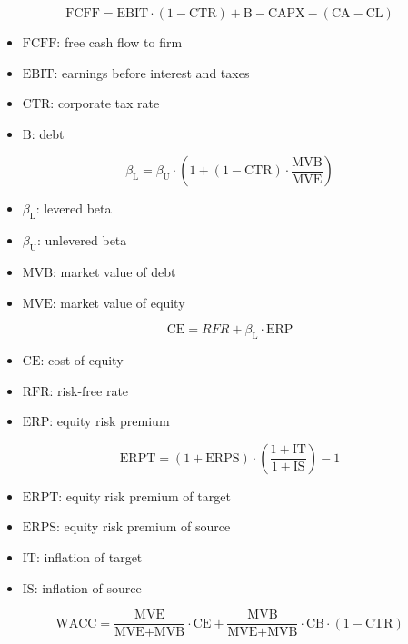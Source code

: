 $$
\text{FCFF} = \text{EBIT} \cdot (1 - \text{CTR}) + \text{B} - \text{CAPX} - (\text{CA} - \text{CL}) 
$$

\begin{itemize}
  \item[] $\text{FCFF}$: free cash flow to firm
  \item[] $\text{EBIT}$: earnings before interest and taxes
  \item[] $\text{CTR}$: corporate tax rate
  \item[] $\text{B}$: debt
\end{itemize}

$$
\beta_{\text{L}} = \beta_{\text{U}} \cdot \left(1 + (1 - \text{CTR}) \cdot \frac{\text{MVB}}{\text{MVE}}\right)
$$

\begin{itemize}
  \item[] $\beta_{\text{L}}$: levered beta
  \item[] $\beta_{\text{U}}$: unlevered beta
  \item[] $\text{MVB}$: market value of debt
  \item[] $\text{MVE}$: market value of equity
\end{itemize}

$$
\text{CE} = RFR + \beta_{\text{L}} \cdot \text{ERP}
$$

\begin{itemize}
  \item[] $\text{CE}$: cost of equity
  \item[] $\text{RFR}$: risk-free rate
  \item[] $\text{ERP}$: equity risk premium
\end{itemize}

$$
\text{ERPT} = (1 + \text{ERPS}) \cdot \left( \frac{1 + \text{IT}}{1 + \text{IS}} \right) - 1
$$

\begin{itemize}
  \item[] $\text{ERPT}$: equity risk premium of target
  \item[] $\text{ERPS}$: equity risk premium of source
  \item[] $\text{IT}$: inflation of target
  \item[] $\text{IS}$: inflation of source
\end{itemize}

$$
\text{WACC} = \frac{\text{MVE}}{\text{MVE} + \text{MVB}} \cdot \text{CE} + \frac{\text{MVB}}{\text{MVE} + \text{MVB}} \cdot \text{CB} \cdot (1 - \text{CTR})
$$

